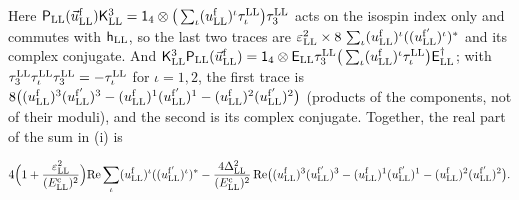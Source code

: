 \documentclass[
  10pt,
]{article}
\begin{document}
Here
\(\mathsf P_{\rm LL}(\vec u^{\rm f}_{\rm LL})\mathsf K^3_{\rm LL}=\mathsf 1_4\otimes\big(\sum_\iota(u^{\rm f}_{\rm LL})^\iota\tau^{\rm LL}_\iota\big)\tau^{\rm LL}_3\)
acts on the isospin index only and commutes with \(\mathsf h_{\rm LL}\),
so the last two traces are
\(\varepsilon_{\rm LL}^2\times8\,\sum_\iota(u^{\rm f}_{\rm LL})^\iota((u^{\rm f'}_{\rm LL})^\iota)^*\)
and its complex conjugate. And
\(\mathsf K^3_{\rm LL}\mathsf P_{\rm LL}(\vec u^{\rm f}_{\rm LL})=\mathsf 1_4\otimes\mathsf E_{\rm LL}\tau^{\rm LL}_3\big(\sum_\iota(u^{\rm f}_{\rm LL})^\iota\tau^{\rm LL}_\iota\big)\mathsf E^\dagger_{\rm LL}\);
with
\(\tau^{\rm LL}_3\tau^{\rm LL}_\iota\tau^{\rm LL}_3=-\tau^{\rm LL}_\iota\)
for \(\iota=1,2\), the first trace is
\(8\big((u^{\rm f}_{\rm LL})^3(u^{\rm f'}_{\rm LL})^3-(u^{\rm f}_{\rm LL})^1(u^{\rm f'}_{\rm LL})^1-(u^{\rm f}_{\rm LL})^2(u^{\rm f'}_{\rm LL})^2\big)\)
(products of the components, not of their moduli), and the second is its
complex conjugate. Together, the real part of the sum in (i) is

\[4\Big(1+\frac{\varepsilon_{\rm LL}^2}{(E^{\rm c}_{\rm LL})^2}\Big){\rm Re}\sum_\iota(u^{\rm f}_{\rm LL})^\iota((u^{\rm f'}_{\rm LL})^\iota)^*-\frac{4\Delta_{\rm LL}^2}{(E^{\rm c}_{\rm LL})^2}\,{\rm Re}\big((u^{\rm f}_{\rm LL})^3(u^{\rm f'}_{\rm LL})^3-(u^{\rm f}_{\rm LL})^1(u^{\rm f'}_{\rm LL})^1-(u^{\rm f}_{\rm LL})^2(u^{\rm f'}_{\rm LL})^2\big).\]
\end{document}
